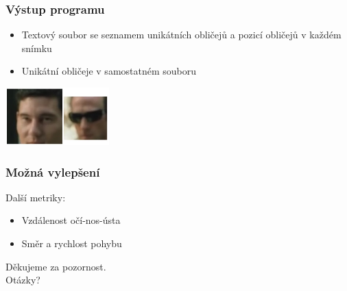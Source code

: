 \documentclass{beamer}
\begin{document}
	\begin{frame}[t,fragile]
		\frametitle{Výstup programu}	
		
		\begin{itemize}
			\item Textový soubor se seznamem unikátních obličejů a pozicí obličejů v každém snímku	
			\item Unikátní obličeje v samostatném souboru
		\end{itemize}
		\centering\includegraphics[width=4cm]{img/faces.jpg}
		
					
	\end{frame}			
	
			
	
	\begin{frame}[t,fragile]
		\frametitle{Možná vylepšení}	
		Další metriky:
		\begin{itemize}
			\item Vzdálenost očí-nos-ústa	
			\item Směr a rychlost pohybu
		\end{itemize}		
					
	\end{frame}			
	
	\begin{frame}[t,fragile]

		\vspace{30mm}
\centering
\Huge Děkujeme za pozornost.\\ Otázky?
						
		
	\end{frame}

	
\end{document}
